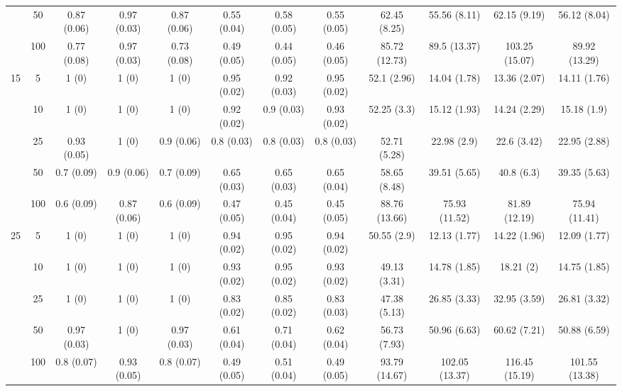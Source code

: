 \documentclass[11pt]{article}
\theoremstyle{definition}
\begin{document}
\begin{landscape}
\begin{table}[b]
\begin{center}
{\begin{tabular}{cc|ccc|ccc|cccc|}
  & 50  & 0.87 (0.06) & 0.97 (0.03) & 0.87 (0.06) & 0.55 (0.04) & 0.58 (0.05) & 0.55 (0.05) & 62.45 (8.25) & 55.56 (8.11) & 62.15 (9.19) & 56.12 (8.04) \\ 
  & 100  & 0.77 (0.08) & 0.97 (0.03) & 0.73 (0.08) & 0.49 (0.05) & 0.44 (0.05) & 0.46 (0.05) & 85.72 (12.73) & 89.5 (13.37) & 103.25 (15.07) & 89.92 (13.29) \\[.3cm] 
 \multirow{5}{*}{15} & 5  & 1 (0) & 1 (0) & 1 (0) & 0.95 (0.02) & 0.92 (0.03) & 0.95 (0.02) & 52.1 (2.96) & 14.04 (1.78) & 13.36 (2.07) & 14.11 (1.76) \\ 
  & 10  & 1 (0) & 1 (0) & 1 (0) & 0.92 (0.02) & 0.9 (0.03) & 0.93 (0.02) & 52.25 (3.3) & 15.12 (1.93) & 14.24 (2.29) & 15.18 (1.9) \\ 
    & 25  & 0.93 (0.05) & 1 (0) & 0.9 (0.06) & 0.8 (0.03) & 0.8 (0.03) & 0.8 (0.03) & 52.71 (5.28) & 22.98 (2.9) & 22.6 (3.42) & 22.95 (2.88) \\ 
    & 50  & 0.7 (0.09) & 0.9 (0.06) & 0.7 (0.09) & 0.65 (0.03) & 0.65 (0.03) & 0.65 (0.04) & 58.65 (8.48) & 39.51 (5.65) & 40.8 (6.3) & 39.35 (5.63) \\ 
    & 100  & 0.6 (0.09) & 0.87 (0.06) & 0.6 (0.09) & 0.47 (0.05) & 0.45 (0.04) & 0.45 (0.05) & 88.76 (13.66) & 75.93 (11.52) & 81.89 (12.19) & 75.94 (11.41) \\[.3cm] 
   \multirow{5}{*}{25} & 5  & 1 (0) & 1 (0) & 1 (0) & 0.94 (0.02) & 0.95 (0.02) & 0.94 (0.02) & 50.55 (2.9) & 12.13 (1.77) & 14.22 (1.96) & 12.09 (1.77) \\ 
    & 10  & 1 (0) & 1 (0) & 1 (0) & 0.93 (0.02) & 0.95 (0.02) & 0.93 (0.02) & 49.13 (3.31) & 14.78 (1.85) & 18.21 (2) & 14.75 (1.85) \\ 
    & 25  & 1 (0) & 1 (0) & 1 (0) & 0.83 (0.02) & 0.85 (0.02) & 0.83 (0.03) & 47.38 (5.13) & 26.85 (3.33) & 32.95 (3.59) & 26.81 (3.32) \\ 
    & 50  & 0.97 (0.03) & 1 (0) & 0.97 (0.03) & 0.61 (0.04) & 0.71 (0.04) & 0.62 (0.04) & 56.73 (7.93) & 50.96 (6.63) & 60.62 (7.21) & 50.88 (6.59) \\ 
    & 100  & 0.8 (0.07) & 0.93 (0.05) & 0.8 (0.07) & 0.49 (0.05) & 0.51 (0.04) & 0.49 (0.05) & 93.79 (14.67) & 102.05 (13.37) & 116.45 (15.19) & 101.55 (13.38) \\
\end{tabular}}
   \end{center}
      \vspace{-.5cm}
\end{table}
\end{landscape}
\end{document}
